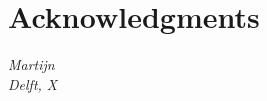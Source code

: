 \chapter*{Acknowledgments}

\todo{}

\begin{flushright}
{\makeatletter\itshape
    Martijn \\
    Delft, X
\makeatother}
\end{flushright}


